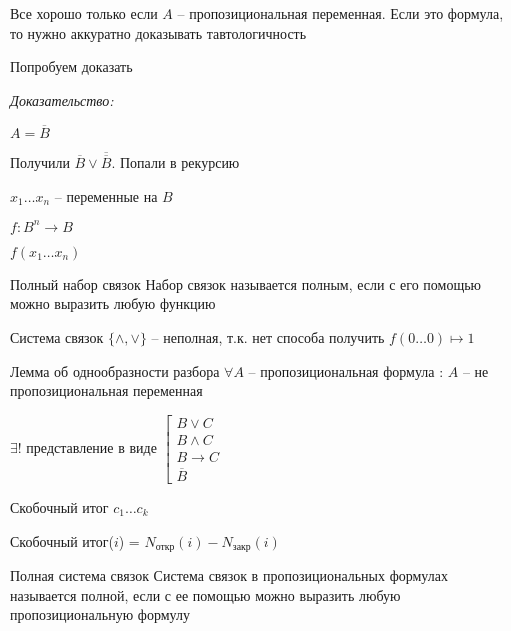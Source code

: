 \documentclass[12pt]{article}
\begin{document}
\begin{Remark}{}
    Все хорошо только если $A$ -- пропозициональная переменная. Если это формула, то нужно аккуратно доказывать тавтологичность

    Попробуем доказать
\end{Remark}

\textit{Доказательство:}

$A = \overline{B}$

Получили $\overline{B} \lor \overline{\overline{B}}$. Попали в рекурсию

\newpage

$x_1 \ldots x_n$ -- переменные на $B$

$f : B^n \to B$

$f(x_1 \ldots x_n)$

\begin{defin}{Полный набор связок}
    Набор связок называется полным, если с его помощью можно выразить любую функцию
\end{defin}

\begin{Example}{}
    Система связок $\{\land, \lor\}$ -- неполная, т.к. нет способа получить $f(0 \ldots 0) \mapsto 1$
\end{Example}

\begin{lem}{Лемма об однообразности разбора}
    $\forall A$ -- пропозициональная формула : $A$ -- не пропозициональная переменная 
    
    $\exists!$ представление в виде $\left[ \begin{gathered}
        B \lor C \\
        B \land C \\
        B \to C \\
        \overline{B}
    \end{gathered} \right.$
\end{lem}

\begin{defin}{Скобочный итог}
    $c_1 \ldots c_k$

    Скобочный итог($i$) = $N_\text{откр}(i) - N_\text{закр}(i)$
\end{defin}

\begin{defin}{Полная система связок}
    Система связок в пропозициональных формулах называется полной, если с ее помощью можно выразить любую пропозициональную формулу
\end{defin}
\end{document}
